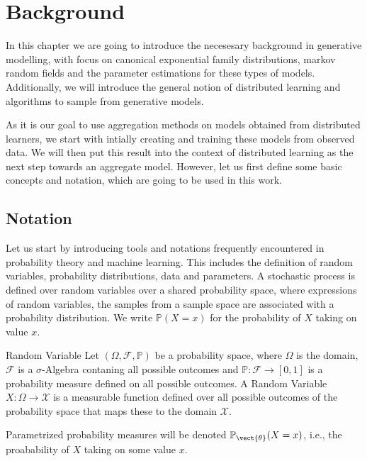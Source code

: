 \chapter{Background}
\label{chapter:kap2}
In this chapter we are going to introduce the necesesary background in generative modelling, with focus on canonical exponential family distributions, markov random fields and the parameter estimations for these types of models.
Additionally, we will introduce the general notion of distributed learning and algorithms to sample from generative models.

As it is our goal to use aggregation methods on models obtained from distributed learners, we start with intially creating and training these models from observed data. 
We will then put this result into the context of distributed learning as the next step towards an  aggregate model.
However, let us first define some basic concepts and notation, which are going to be used in this work.


\section{Notation}
    \label{sec:nota}
    Let us start by introducing tools and notations frequently encountered in probability theory and machine learning.
    This includes the definition of random variables, probability distributions, data and parameters.
    A stochastic process is defined over random variables over a shared probability space, where expressions of random variables, the samples from a sample space are associated with a probability distribution. 
    We write $\mathbb{P}(X = x)$ for the probability of $X$ taking on value $x$.
    \begin{definition}{Random Variable}
        \label{def:randvar}
        Let $(\Omega, \mathcal{F}, \mathbb{P})$ be a probability space, where $\Omega$ is the domain, $\mathcal{F}$ is a $\sigma$-Algebra contaning all possible outcomes and $\mathbb{P}: \mathcal{F} \rightarrow [0,1]$ is a probability measure defined on all possible outcomes.
        A Random Variable $X: \Omega \rightarrow \mathcal{X}$ is a measurable function defined over all possible outcomes of the probability space that maps these to the domain $\mathcal{X}$.

        Parametrized probability measures will be denoted $\mathbb{P}_{\vect{\theta}} (X = x)$, i.e., the proabability of $X$ taking on some value $x$.
    \end{definition}

